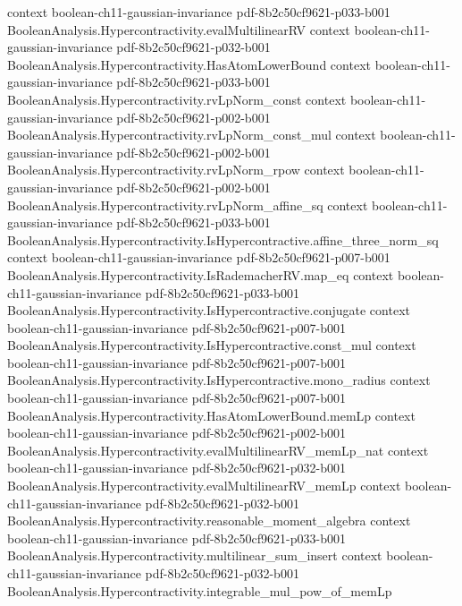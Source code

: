 \begin{theorem}
  {context}
  {boolean-ch11-gaussian-invariance}
  {pdf-8b2c50cf9621-p033-b001}
\proofstep
  {BooleanAnalysis.Hypercontractivity.evalMultilinearRV}
  {context}
  {boolean-ch11-gaussian-invariance}
  {pdf-8b2c50cf9621-p032-b001}
\proofstep
  {BooleanAnalysis.Hypercontractivity.HasAtomLowerBound}
  {context}
  {boolean-ch11-gaussian-invariance}
  {pdf-8b2c50cf9621-p033-b001}
\proofstep
  {BooleanAnalysis.Hypercontractivity.rvLpNorm_const}
  {context}
  {boolean-ch11-gaussian-invariance}
  {pdf-8b2c50cf9621-p002-b001}
\proofstep
  {BooleanAnalysis.Hypercontractivity.rvLpNorm_const_mul}
  {context}
  {boolean-ch11-gaussian-invariance}
  {pdf-8b2c50cf9621-p002-b001}
\proofstep
  {BooleanAnalysis.Hypercontractivity.rvLpNorm_rpow}
  {context}
  {boolean-ch11-gaussian-invariance}
  {pdf-8b2c50cf9621-p002-b001}
\proofstep
  {BooleanAnalysis.Hypercontractivity.rvLpNorm_affine_sq}
  {context}
  {boolean-ch11-gaussian-invariance}
  {pdf-8b2c50cf9621-p033-b001}
\proofstep
  {BooleanAnalysis.Hypercontractivity.IsHypercontractive.affine_three_norm_sq}
  {context}
  {boolean-ch11-gaussian-invariance}
  {pdf-8b2c50cf9621-p007-b001}
\proofstep
  {BooleanAnalysis.Hypercontractivity.IsRademacherRV.map_eq}
  {context}
  {boolean-ch11-gaussian-invariance}
  {pdf-8b2c50cf9621-p033-b001}
\proofstep
  {BooleanAnalysis.Hypercontractivity.IsHypercontractive.conjugate}
  {context}
  {boolean-ch11-gaussian-invariance}
  {pdf-8b2c50cf9621-p007-b001}
\proofstep
  {BooleanAnalysis.Hypercontractivity.IsHypercontractive.const_mul}
  {context}
  {boolean-ch11-gaussian-invariance}
  {pdf-8b2c50cf9621-p007-b001}
\proofstep
  {BooleanAnalysis.Hypercontractivity.IsHypercontractive.mono_radius}
  {context}
  {boolean-ch11-gaussian-invariance}
  {pdf-8b2c50cf9621-p007-b001}
\proofstep
  {BooleanAnalysis.Hypercontractivity.HasAtomLowerBound.memLp}
  {context}
  {boolean-ch11-gaussian-invariance}
  {pdf-8b2c50cf9621-p002-b001}
\proofstep
  {BooleanAnalysis.Hypercontractivity.evalMultilinearRV_memLp_nat}
  {context}
  {boolean-ch11-gaussian-invariance}
  {pdf-8b2c50cf9621-p032-b001}
\proofstep
  {BooleanAnalysis.Hypercontractivity.evalMultilinearRV_memLp}
  {context}
  {boolean-ch11-gaussian-invariance}
  {pdf-8b2c50cf9621-p032-b001}
\proofstep
  {BooleanAnalysis.Hypercontractivity.reasonable_moment_algebra}
  {context}
  {boolean-ch11-gaussian-invariance}
  {pdf-8b2c50cf9621-p033-b001}
\proofstep
  {BooleanAnalysis.Hypercontractivity.multilinear_sum_insert}
  {context}
  {boolean-ch11-gaussian-invariance}
  {pdf-8b2c50cf9621-p032-b001}
\proofstep
  {BooleanAnalysis.Hypercontractivity.integrable_mul_pow_of_memLp}

\end{theorem}
